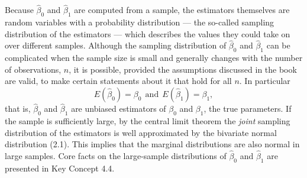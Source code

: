 \documentclass[]{book}
\theoremstyle{definition}
\theoremstyle{definition}
\theoremstyle{definition}
\theoremstyle{remark}
\begin{document}
Because \(\hat{\beta}_0\) and \(\hat{\beta}_1\) are computed from a
sample, the estimators themselves are random variables with a
probability distribution --- the so-called sampling distribution of the
estimators --- which describes the values they could take on over
different samples. Although the sampling distribution of \(\hat\beta_0\)
and \(\hat\beta_1\) can be complicated when the sample size is small and
generally changes with the number of observations, \(n\), it is
possible, provided the assumptions discussed in the book are valid, to
make certain statements about it that hold for all \(n\). In particular
\[ E(\hat{\beta}_0) = \beta_0 \ \ \text{and} \ \  E(\hat{\beta}_1) = \beta_1,\]
that is, \(\hat\beta_0\) and \(\hat\beta_1\) are unbiased estimators of
\(\beta_0\) and \(\beta_1\), the true parameters. If the sample is
sufficiently large, by the central limit theorem the \emph{joint}
sampling distribution of the estimators is well approximated by the
bivariate normal distribution (2.1). This implies that the marginal
distributions are also normal in large samples. Core facts on the
large-sample distributions of \(\hat\beta_0\) and \(\hat\beta_1\) are
presented in Key Concept 4.4.
\end{document}
